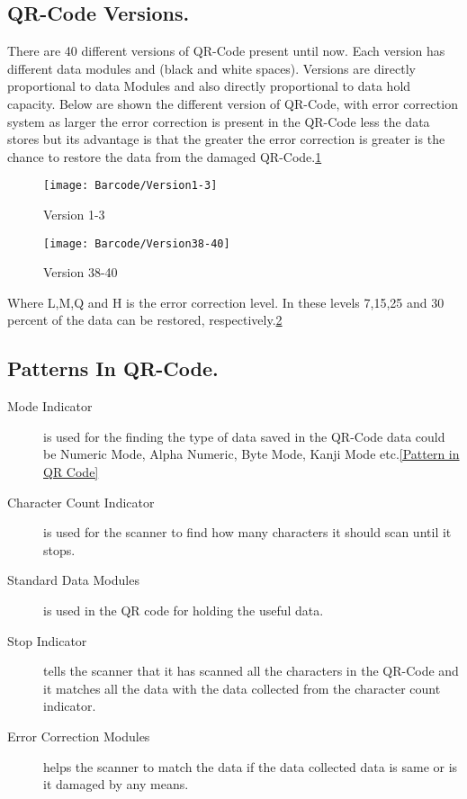 \subsection{QR-Code Versions.}

There are 40 different versions of QR-Code present until now. Each version has different data modules and (black and white spaces).
Versions are directly proportional to data Modules and 	also directly proportional to data hold capacity.
Below are shown the different version of QR-Code, with error correction system as larger the error correction is present in the QR-Code less the data stores but its advantage is that the greater the error correction is greater is the chance to restore the data from the damaged QR-Code.\ref{Version 1-3}

\begin{figure}
	\begin{center}
		\texttt{[image: Barcode/Version1-3]}
		\caption{Version 1-3}\label{Version 1-3}
	\end{center}
\end{figure}

\begin{figure}
	\begin{center}
		\texttt{[image: Barcode/Version38-40]}
		\caption{Version 38-40}
		\label{Version 38-40}
	\end{center}
\end{figure}

Where L,M,Q and H is the error correction level. In these levels 7,15,25 and 30 percent of the data can be restored, respectively.\ref{Version 38-40}

\subsection{Patterns In QR-Code.}

\begin{description}
	\item[Mode Indicator] is used for the finding the type of data saved in the QR-Code data could be Numeric Mode, Alpha Numeric, Byte Mode, Kanji Mode etc.\ref{Pattern in QR Code}
	\item [Character Count Indicator] is used for the scanner to find how many characters it should scan until it stops.
	\item [Standard Data Modules] is used in the QR code for holding the useful data.
	\item [Stop Indicator] tells the scanner that it has scanned all the characters in the QR-Code and it matches all the data with the data collected from the character count indicator.
	\item [Error Correction Modules] helps the scanner to match the data if the data collected data is same or is it damaged by any means.
\end{description}


